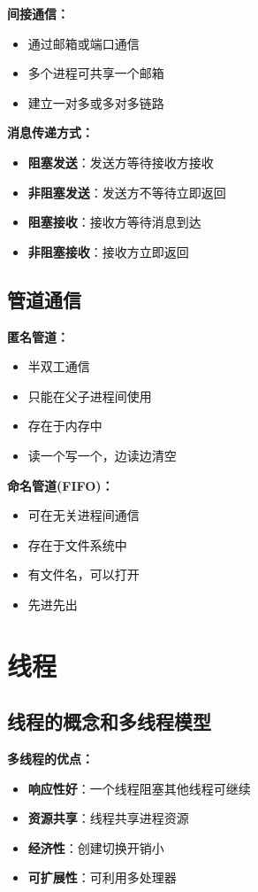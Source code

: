 \documentclass[lang=cn,newtx,10pt,scheme=chinese]{../../elegantbook}
\begin{document}
\textbf{间接通信：}
\begin{itemize}
  \item 通过邮箱或端口通信
  \item 多个进程可共享一个邮箱
  \item 建立一对多或多对多链路
\end{itemize}

\textbf{消息传递方式：}
\begin{itemize}
  \item \textbf{阻塞发送}：发送方等待接收方接收
  \item \textbf{非阻塞发送}：发送方不等待立即返回
  \item \textbf{阻塞接收}：接收方等待消息到达
  \item \textbf{非阻塞接收}：接收方立即返回
\end{itemize}

\subsection{管道通信}

\textbf{匿名管道：}
\begin{itemize}
  \item 半双工通信
  \item 只能在父子进程间使用
  \item 存在于内存中
  \item 读一个写一个，边读边清空
\end{itemize}

\textbf{命名管道(FIFO)：}
\begin{itemize}
  \item 可在无关进程间通信
  \item 存在于文件系统中
  \item 有文件名，可以打开
  \item 先进先出
\end{itemize}

\section{线程}

\subsection{线程的概念和多线程模型}

\textbf{多线程的优点：}
\begin{itemize}
  \item \textbf{响应性好}：一个线程阻塞其他线程可继续
  \item \textbf{资源共享}：线程共享进程资源
  \item \textbf{经济性}：创建切换开销小
  \item \textbf{可扩展性}：可利用多处理器
\end{itemize}
\end{document}
